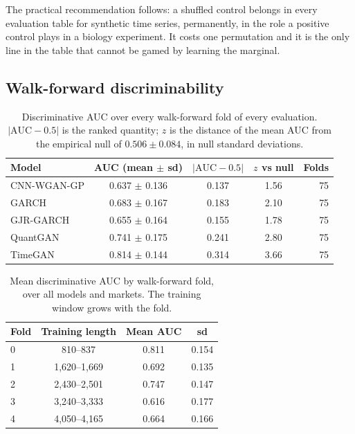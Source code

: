 \documentclass[11pt,a4paper]{article}
\makeatletter
\DeclareRobustCommand{\_}{\ifmmode\nfss@text{\textunderscore}\else\textunderscore\allowbreak\fi}
\makeatother
\begin{document}
The practical recommendation follows: a shuffled control belongs in every evaluation table for synthetic time series, permanently, in the role a positive control plays in a biology experiment. It costs one permutation and it is the only line in the table that cannot be gamed by learning the marginal.

\subsection{Walk-forward discriminability}
\label{sec:walkforward}

\begin{table}[htbp]
\centering
\caption{Discriminative AUC over every walk-forward fold of every evaluation. $|\mathrm{AUC}-0.5|$ is the ranked quantity; $z$ is the distance of the mean AUC from the empirical null of $0.506\pm0.084$, in null standard deviations.}
\label{tab:auc}
\begin{tabular}{@{}lcccr@{}}
\toprule
Model & AUC (mean $\pm$ sd) & $|\mathrm{AUC}-0.5|$ & $z$ vs null & Folds \\
\midrule
CNN-WGAN-GP & 0.637 $\pm$ 0.136 & 0.137 & 1.56 & 75 \\
GARCH & 0.683 $\pm$ 0.167 & 0.183 & 2.10 & 75 \\
GJR-GARCH & 0.655 $\pm$ 0.164 & 0.155 & 1.78 & 75 \\
QuantGAN & 0.741 $\pm$ 0.175 & 0.241 & 2.80 & 75 \\
TimeGAN & 0.814 $\pm$ 0.144 & 0.314 & 3.66 & 75 \\
\bottomrule
\end{tabular}
\end{table}

\begin{table}[htbp]
\centering
\caption{Mean discriminative AUC by walk-forward fold, over all models and markets. The training window grows with the fold.}
\label{tab:folds}
\begin{tabular}{@{}lccc@{}}
\toprule
Fold & Training length & Mean AUC & sd \\
\midrule
0 & 810--837 & 0.811 & 0.154 \\
1 & 1,620--1,669 & 0.692 & 0.135 \\
2 & 2,430--2,501 & 0.747 & 0.147 \\
3 & 3,240--3,333 & 0.616 & 0.177 \\
4 & 4,050--4,165 & 0.664 & 0.166 \\
\bottomrule
\end{tabular}
\end{table}
\end{document}
